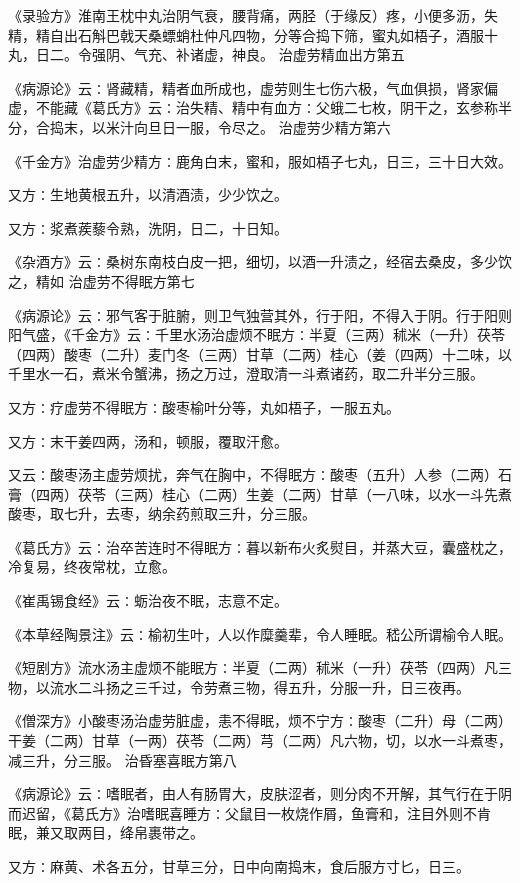 \documentclass[a4paper,12pt,UTF8,twoside]{ctexbook}
\begin{document}
《录验方》淮南王枕中丸治阴气衰，腰背痛，两胫（于缘反）疼，小便多沥，失精，精自出石斛巴戟天桑螵蛸杜仲凡四物，分等合捣下筛，蜜丸如梧子，酒服十丸，日二。令强阴、气充、补诸虚，神良。
治虚劳精血出方第五

《病源论》云∶肾藏精，精者血所成也，虚劳则生七伤六极，气血俱损，肾家偏虚，不能藏《葛氏方》云∶治失精、精中有血方∶父蛾二七枚，阴干之，玄参称半分，合捣末，以米汁向旦日一服，令尽之。
治虚劳少精方第六

《千金方》治虚劳少精方∶鹿角白末，蜜和，服如梧子七丸，日三，三十日大效。

又方∶生地黄根五升，以清酒渍，少少饮之。

又方∶浆煮蒺藜令熟，洗阴，日二，十日知。

《杂酒方》云∶桑树东南枝白皮一把，细切，以酒一升渍之，经宿去桑皮，多少饮之，精如
治虚劳不得眠方第七

《病源论》云∶邪气客于脏腑，则卫气独营其外，行于阳，不得入于阴。行于阳则阳气盛，《千金方》云∶千里水汤治虚烦不眠方∶半夏（三两）秫米（一升）茯苓（四两）酸枣（二升）麦门冬（三两）甘草（二两）桂心（姜（四两）十二味，以千里水一石，煮米令蟹沸，扬之万过，澄取清一斗煮诸药，取二升半分三服。

又方∶疗虚劳不得眠方∶酸枣榆叶分等，丸如梧子，一服五丸。

又方∶末干姜四两，汤和，顿服，覆取汗愈。

又云∶酸枣汤主虚劳烦扰，奔气在胸中，不得眠方∶酸枣（五升）人参（二两）石膏（四两）茯苓（三两）桂心（二两）生姜（二两）甘草（一八味，以水一斗先煮酸枣，取七升，去枣，纳余药煎取三升，分三服。

《葛氏方》云∶治卒苦连时不得眠方∶暮以新布火炙熨目，并蒸大豆，囊盛枕之，冷复易，终夜常枕，立愈。

《崔禹锡食经》云∶蛎治夜不眠，志意不定。

《本草经陶景注》云∶榆初生叶，人以作糜羹辈，令人睡眠。嵇公所谓榆令人眠。

《短剧方》流水汤主虚烦不能眠方∶半夏（二两）秫米（一升）茯苓（四两）凡三物，以流水二斗扬之三千过，令劳煮三物，得五升，分服一升，日三夜再。

《僧深方》小酸枣汤治虚劳脏虚，恚不得眠，烦不宁方∶酸枣（二升）母（二两）干姜（二两）甘草（一两）茯苓（二两）芎（二两）凡六物，切，以水一斗煮枣，减三升，分三服。
治昏塞喜眠方第八

《病源论》云∶嗜眠者，由人有肠胃大，皮肤涩者，则分肉不开解，其气行在于阴而迟留，《葛氏方》治嗜眠喜睡方∶父鼠目一枚烧作屑，鱼膏和，注目外则不肯眠，兼又取两目，绛帛裹带之。

又方∶麻黄、术各五分，甘草三分，日中向南捣末，食后服方寸匕，日三。
\end{document}
